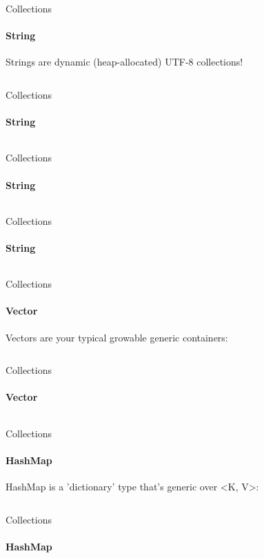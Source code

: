 \documentclass[usenames,dvipsnames,10pt,aspectratio=169]{beamer}
\begin{document}
\begin{frame}{Collections}
	\framesubtitle{String}
	\large
	Strings are dynamic (heap-allocated) UTF-8 collections!
	\vspace{0.3cm}
	\inputminted[fontsize=\large]{rust}{code/string.rs}
	\vspace{0.3cm}
\end{frame}

\begin{frame}{Collections}
	\framesubtitle{String}
	\large
	\inputminted[fontsize=\large]{rust}{code/string1.rs}
	\vspace{0.3cm}
\end{frame}

\begin{frame}{Collections}
	\framesubtitle{String}
	\large
	\inputminted[fontsize=\large]{rust}{code/string2.rs}
	\vspace{0.3cm}
\end{frame}

\begin{frame}{Collections}
	\framesubtitle{String}
	\large
	\inputminted[fontsize=\large]{rust}{code/string3.rs}
	\vspace{0.3cm}
\end{frame}

\begin{frame}{Collections}
	\framesubtitle{Vector}
	\large
	Vectors are your typical growable generic containers:
	\vspace{0.3cm}
	\inputminted[fontsize=\large]{rust}{code/vector.rs}
\end{frame}

\begin{frame}{Collections}
	\framesubtitle{Vector}
	\large
	\inputminted[fontsize=\normalsize]{rust}{code/vector1.rs}
	\vspace{0.3cm}
\end{frame}

\begin{frame}{Collections}
	\framesubtitle{HashMap}
	\large
	HashMap is a 'dictionary' type that's generic over <K, V>:
	\vspace{0.2cm}
	\inputminted[fontsize=\normalsize]{rust}{code/hashmap.rs}
\end{frame}

\begin{frame}{Collections}
	\framesubtitle{HashMap}
	\large
	\inputminted[fontsize=\large]{rust}{code/hashmap1.rs}
	\vspace{0.3cm}
\end{frame}
\end{document}
